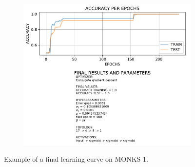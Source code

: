 \begin{appendices}
\begin{figure}[H]
\begin{subfigure}{0.60\textwidth}
{                            \includegraphics{img/CGD/PR/cgd_accuracy_test_pr_monks_1.pdf}
                        }
                        \caption{}
                        \label{fig:monks_1_ACC_CGD_PR}
                    \end{subfigure}
                    \caption{Example of a final learning curve on MONKS 1.}
                    \label{fig:monks_1_CGD_PR}
                \end{figure}


\end{appendices}
